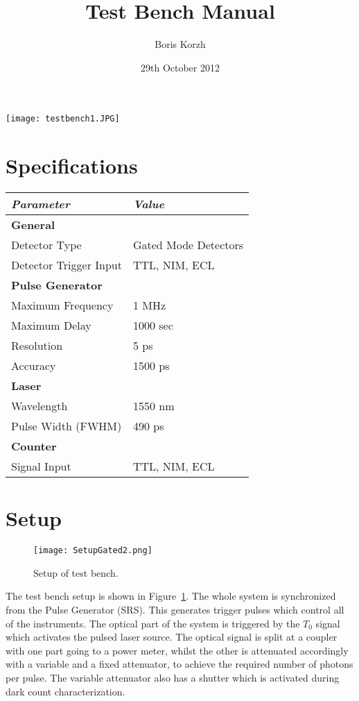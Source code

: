 \documentclass{article}
\title{Test Bench Manual}
\author{Boris Korzh}
\date{29th October 2012}
\begin{document}
\maketitle
\begin{center}
\texttt{[image: testbench1.JPG]}
\end{center}


\section{Specifications}
\begin{center}
\begin{tabular}{ | l | l |  }
\hline
\emph{Parameter} & \emph{Value} \\ \hline
{\bf General } &   \\ \hline
Detector Type & Gated Mode Detectors \\ \hline
Detector Trigger Input & TTL, NIM, ECL \\ \hline

{\bf Pulse Generator } &   \\ \hline
Maximum Frequency & 1 MHz  \\ \hline
Maximum Delay & 1000 sec  \\ \hline
Resolution & 5 ps  \\ \hline
Accuracy & 1500 ps  \\ \hline

\bf{Laser} & \\ \hline
Wavelength & 1550 nm \\ \hline
Pulse Width (FWHM) & 490 ps \\ \hline
\bf{Counter} & \\ \hline

Signal Input & TTL, NIM, ECL \\ \hline
\end{tabular}
\end{center}


\section{Setup}

\begin{figure}
\centering
\texttt{[image: SetupGated2.png]}
\caption{Setup of test bench.}
\label{setup}
\end{figure}
The test bench setup is shown in Figure~\ref{setup}. The whole system is synchronized from the Pulse Generator (SRS). This generates trigger pulses which control all of the instruments. The optical part of the system is triggered by the $T_{0}$ signal which activates the pulsed laser source. The optical signal is split at a coupler with one part going to a power meter, whilst the other is attenuated accordingly with a variable and a fixed attenuator, to achieve the required number of photons per pulse. The variable attenuator also has a shutter which is activated during dark count characterization.
\end{document}
